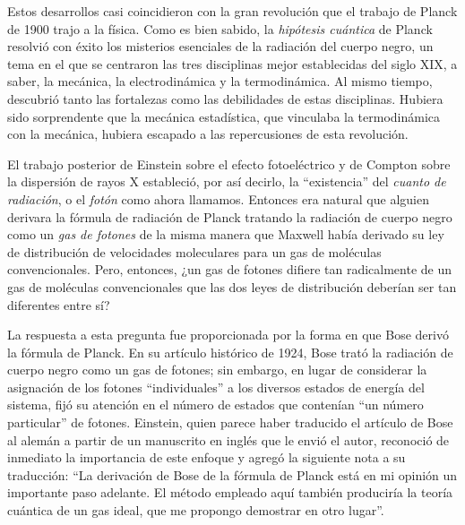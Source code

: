 \par
Estos desarrollos casi coincidieron con la gran revolución que el trabajo de Planck de 1900 trajo a la física. Como es bien sabido, la \emph{hipótesis cuántica} de Planck resolvió con éxito los misterios esenciales de la radiación del cuerpo negro, un tema en el que se centraron las tres disciplinas mejor establecidas del siglo XIX, a saber, la mecánica, la electrodinámica y la termodinámica. Al mismo tiempo, descubrió tanto las fortalezas como las debilidades de estas disciplinas. Hubiera sido sorprendente que la mecánica estadística, que vinculaba la termodinámica con la mecánica, hubiera escapado a las repercusiones de esta revolución.
\par
El trabajo posterior de Einstein sobre el efecto fotoeléctrico y de Compton sobre la dispersión de rayos X estableció, por así decirlo, la \enquote{existencia} del \emph{cuanto de radiación}, o el \emph{fotón} como ahora llamamos. Entonces era natural que alguien derivara la fórmula de radiación de Planck tratando la radiación de cuerpo negro como un \emph{gas de fotones} de la misma manera que Maxwell había derivado su ley de distribución de velocidades moleculares para un gas de moléculas convencionales. Pero, entonces, ¿un gas de fotones difiere tan radicalmente de un gas de moléculas convencionales que las dos leyes de distribución deberían ser tan diferentes entre sí?
\par
La respuesta a esta pregunta fue proporcionada por la forma en que Bose derivó la fórmula de Planck. En su artículo histórico de 1924, Bose trató la radiación de cuerpo negro como un gas de fotones; sin embargo, en lugar de considerar la asignación de los fotones \enquote{individuales} a los diversos estados de energía del sistema, fijó su atención en el número de estados que contenían \enquote{un número particular} de fotones. Einstein, quien parece haber traducido el artículo de Bose al alemán a partir de un manuscrito en inglés que le envió el autor, reconoció de inmediato la importancia de este enfoque y agregó la siguiente nota a su traducción: \enquote{La derivación de Bose de la fórmula de Planck está en mi opinión un importante paso adelante. El método empleado aquí también produciría la teoría cuántica de un gas ideal, que me propongo demostrar en otro lugar}.
\par
